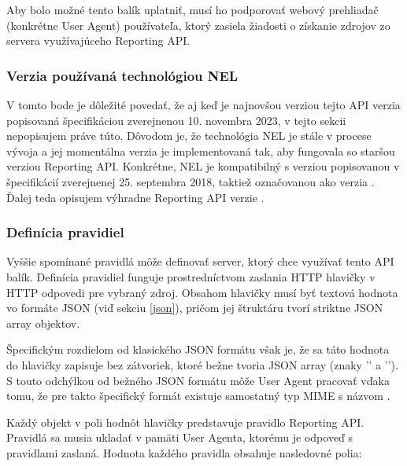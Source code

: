 Aby bolo možné tento balík uplatniť, musí ho podporovať webový prehliadač (konkrétne User Agent) používateľa, ktorý zasiela žiadosti o získanie zdrojov zo servera využívajúceho Reporting API.

\subsubsection{Verzia používaná technológiou NEL}

V tomto bode je dôležité povedať, že aj keď je najnovšou verziou tejto API verzia popisovaná špecifikáciou zverejnenou 10. novembra 2023, v tejto sekcii nepopisujem práve túto.
Dôvodom je, že technológia NEL je stále v procese vývoja a jej momentálna verzia je implementovaná tak, aby fungovala so staršou verziou Reporting API.
Konkrétne, NEL je kompatibilný s verziou popisovanou v špecifikácií zverejnenej 
25. septembra 2018, taktiež označovanou ako verzia \textbf{}.
Ďalej teda opisujem výhradne Reporting API verzie .

\subsubsection{Definícia pravidiel}

Vyššie spomínané pravidlá môže definovať server, ktorý chce využívať tento API balík. 
Definícia pravidiel funguje prostredníctvom zaslania HTTP hlavičky  v HTTP odpovedi pre vybraný zdroj.
Obsahom hlavičky  musí byť textová hodnota vo formáte JSON (viď sekciu \ref{json}), pričom jej štruktáru tvorí striktne JSON array objektov.

Špecifickým rozdielom od klasického JSON formátu však je, že sa táto hodnota do hlavičky
zapisuje bez zátvoriek, ktoré bežne tvoria JSON array (znaky '\code{[}' a '\code{]}').
S touto odchýlkou od bežného JSON formátu môže User Agent pracovať vďaka tomu, že pre takto špecifický formát existuje samostatný typ MIME s názvom . 

\pagebreak

Každý objekt v poli hodnôt hlavičky  predstavuje pravidlo Reporting API.
Pravidlá sa musia ukladať v pamäti User Agenta, ktorému je odpoveď s pravidlami zaslaná.
Hodnota každého pravidla obsahuje nasledovné polia: 

